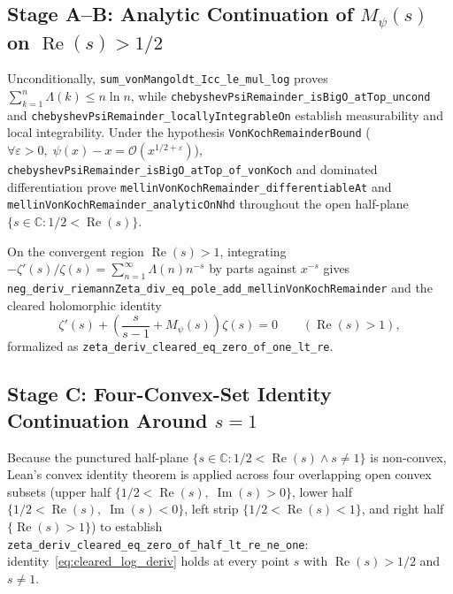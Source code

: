 \documentclass[11pt,a4paper]{article}
\theoremstyle{definition}
\newcommand{\Cfield}{\mathbb{C}}
\begin{document}
\subsection{Stage A--B: Analytic Continuation of $M_\psi(s)$ on $\operatorname{Re}(s) > 1/2$}
Unconditionally, \texttt{sum\_\allowbreak vonMangoldt\_\allowbreak Icc\_\allowbreak le\_\allowbreak mul\_\allowbreak log} proves $\sum_{k=1}^n \Lambda(k) \le n \ln n$, while \texttt{chebyshevPsi\allowbreak Remainder\_\allowbreak isBigO\_\allowbreak atTop\_\allowbreak uncond} and \texttt{chebyshevPsi\allowbreak Remainder\_\allowbreak locally\allowbreak IntegrableOn} establish measurability and local integrability. Under the hypothesis \texttt{VonKoch\allowbreak RemainderBound} ($\forall \varepsilon > 0,\; \psi(x) - x = \mathcal{O}(x^{1/2+\varepsilon})$), \texttt{chebyshevPsi\allowbreak Remainder\_\allowbreak isBigO\_\allowbreak atTop\_\allowbreak of\_\allowbreak vonKoch} and dominated differentiation prove \texttt{mellin\allowbreak VonKoch\allowbreak Remainder\_\allowbreak differentiableAt} and \texttt{mellin\allowbreak VonKoch\allowbreak Remainder\_\allowbreak analyticOnNhd} throughout the open half-plane $\{s \in \Cfield : 1/2 < \operatorname{Re}(s)\}$.

On the convergent region $\operatorname{Re}(s) > 1$, integrating $-\zeta'(s)/\zeta(s) = \sum_{n=1}^\infty \Lambda(n) n^{-s}$ by parts against $x^{-s}$ gives \texttt{neg\_\allowbreak deriv\_\allowbreak riemannZeta\_\allowbreak div\_\allowbreak eq\_\allowbreak pole\_\allowbreak add\_\allowbreak mellinVonKochRemainder} and the cleared holomorphic identity
\begin{equation}\label{eq:cleared_log_deriv}
\zeta'(s) + \left(\frac{s}{s - 1} + M_\psi(s)\right)\zeta(s) = 0 \qquad (\operatorname{Re}(s) > 1),
\end{equation}
formalized as \texttt{zeta\_\allowbreak deriv\_\allowbreak cleared\_\allowbreak eq\_\allowbreak zero\_\allowbreak of\_\allowbreak one\_\allowbreak lt\_\allowbreak re}.

\subsection{Stage C: Four-Convex-Set Identity Continuation Around $s = 1$}
Because the punctured half-plane $\{s \in \Cfield : 1/2 < \operatorname{Re}(s) \land s \neq 1\}$ is non-convex, Lean's convex identity theorem is applied across four overlapping open convex subsets (upper half $\{1/2 < \operatorname{Re}(s),\; \operatorname{Im}(s) > 0\}$, lower half $\{1/2 < \operatorname{Re}(s),\; \operatorname{Im}(s) < 0\}$, left strip $\{1/2 < \operatorname{Re}(s) < 1\}$, and right half $\{\operatorname{Re}(s) > 1\}$) to establish \texttt{zeta\_\allowbreak deriv\_\allowbreak cleared\_\allowbreak eq\_\allowbreak zero\_\allowbreak of\_\allowbreak half\_\allowbreak lt\_\allowbreak re\_\allowbreak ne\_\allowbreak one}: identity~\eqref{eq:cleared_log_deriv} holds at every point $s$ with $\operatorname{Re}(s) > 1/2$ and $s \neq 1$.
\end{document}
